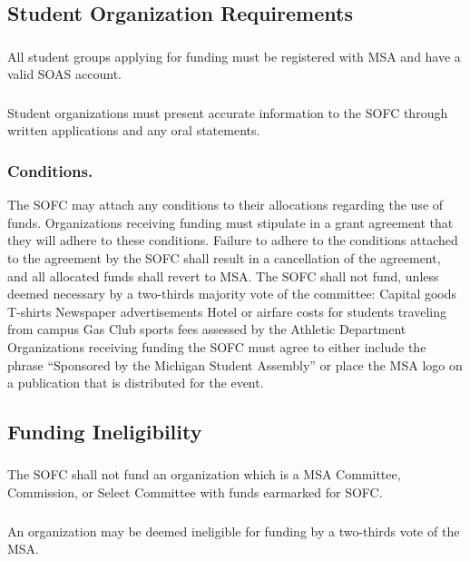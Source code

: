 \subsection{Student Organization Requirements}
\subsubsection{}
All student groups applying for funding must be registered with MSA and have a valid SOAS account.
\subsubsection{}
Student organizations must present accurate information to the SOFC through written applications and any oral statements.
\subsubsection{Conditions.}
\subsubsubsection{}
The SOFC may attach any conditions to their allocations regarding the use of funds.
\subsubsubsection{}
Organizations receiving funding must stipulate in a grant agreement that they will adhere to these conditions.
\subsubsubsection{}
Failure to adhere to the conditions attached to the agreement by the SOFC shall result in a cancellation of the agreement, and all allocated funds shall revert to MSA.
\subsubsubsection{}
The SOFC shall not fund, unless deemed necessary by a two-thirds majority vote of the committee:
\subsubsubsubsection{}
Capital goods
\subsubsubsubsection{}
T-shirts
\subsubsubsubsection{}
Newspaper advertisements
\subsubsubsubsection{}
Hotel or airfare costs for students traveling from campus
\subsubsubsubsection{}
Gas
\subsubsubsubsection{}
Club sports fees assessed by the Athletic Department
\subsubsubsection{}
Organizations receiving funding the SOFC must agree to either include the phrase ``Sponsored by the Michigan Student Assembly'' or place the MSA logo on a publication that is distributed for the event.
 

\subsection{Funding Ineligibility}
\subsubsection{}
The SOFC shall not fund an organization which is a MSA Committee, Commission, or Select Committee with funds earmarked for SOFC. 
\subsubsection{}
An organization may be deemed ineligible for funding by a two-thirds vote of the MSA.

